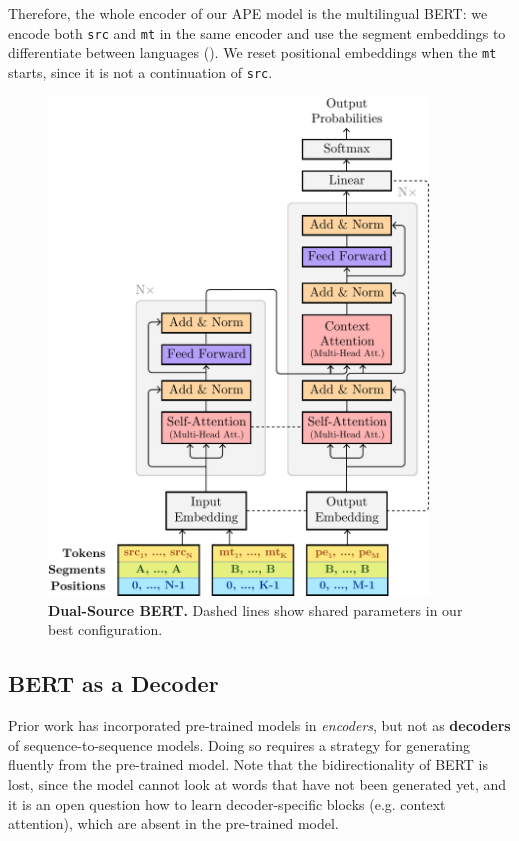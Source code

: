 Therefore, the whole encoder of our APE model is the multilingual
BERT: we encode both {\tt src} and {\tt mt} in the same encoder and
use the segment embeddings to differentiate between languages
(). We reset positional
embeddings when the {\tt mt} starts, since it is not a continuation
of {\tt src}.

\begin{figure}[ht!]
  \centering
  \includegraphics[width=0.9\textwidth]{Figures/bert-ape-diagram.pdf}
  \caption{\textbf{Dual-Source BERT.}
    Dashed lines show shared parameters in our best configuration.}
  \label{fig:transformer_diagram}
\end{figure}

\subsection{BERT as a Decoder}\label{sec:ape_bert_decoder}

Prior work has incorporated pre-trained models in {\it encoders}, but
not as {\bf decoders} of sequence-to-sequence models. Doing so
requires a strategy for generating fluently from the pre-trained
model. Note that the bidirectionality of BERT is lost, since the
model cannot look at words that have not been generated yet, and it
is an open question how to learn decoder-specific blocks (e.g.
context attention), which are absent in the pre-trained model.

